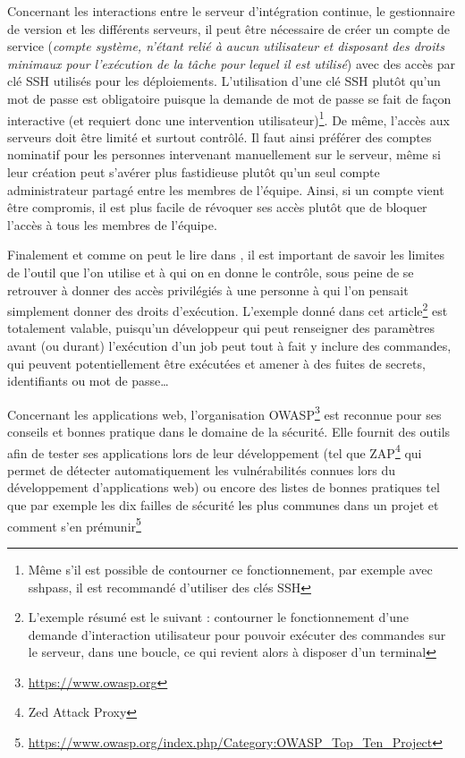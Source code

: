 Concernant les interactions entre le serveur d'intégration continue, le gestionnaire de version et les différents serveurs, il peut être nécessaire de créer un compte de service (\emph{compte système, n'étant relié à aucun utilisateur et disposant des droits minimaux pour l'exécution de la tâche pour lequel il est utilisé}) avec des accès par clé \gls{SSH} utilisés pour les déploiements. L'utilisation d'une clé \gls{SSH} plutôt qu'un mot de passe est obligatoire puisque la demande de mot de passe se fait de façon interactive (et requiert donc une intervention utilisateur)\footnote{Même s'il est possible de contourner ce fonctionnement, par exemple avec sshpass, il est recommandé d'utiliser des clés \gls{SSH}}. De même, l'accès aux serveurs doit être limité et surtout contrôlé. Il faut ainsi préférer des comptes nominatif pour les personnes intervenant manuellement sur le serveur, même si leur création peut s'avérer plus fastidieuse plutôt qu'un seul compte administrateur partagé entre les membres de l'équipe. Ainsi, si un compte vient être compromis, il est plus facile de révoquer ses accès plutôt que de bloquer l'accès à tous les membres de l'équipe.

Finalement et comme on peut le lire dans  \cite{jenkins-security}, il est important de savoir les limites de l'outil que l'on utilise et à qui on en donne le contrôle, sous peine de se retrouver à donner des accès privilégiés à une personne à qui l'on pensait simplement donner des droits d'exécution. L'exemple donné dans cet article\footnote{L'exemple résumé est le suivant : contourner le fonctionnement d'une demande d'interaction utilisateur pour pouvoir exécuter des commandes sur le serveur, dans une boucle, ce qui revient alors à disposer d'un terminal} est totalement valable, puisqu'un développeur qui peut renseigner des paramètres avant (ou durant) l'exécution d'un job peut tout à fait y inclure des commandes, qui peuvent potentiellement être exécutées et amener à des fuites de secrets, identifiants ou mot de passe\ldots{} 

Concernant les applications web, l'organisation \gls{OWASP}\footnote{\url{https://www.owasp.org}} est reconnue pour ses conseils et bonnes pratique dans le domaine de la sécurité. Elle fournit des outils afin de tester ses applications lors de leur développement (tel que ZAP\footnote{Zed Attack Proxy} qui permet de détecter automatiquement les vulnérabilités connues lors du développement d'applications web) ou encore des listes de bonnes pratiques tel que par exemple les dix failles de sécurité les plus communes dans un projet et comment s'en prémunir\footnote{\url{https://www.owasp.org/index.php/Category:OWASP_Top_Ten_Project}}
